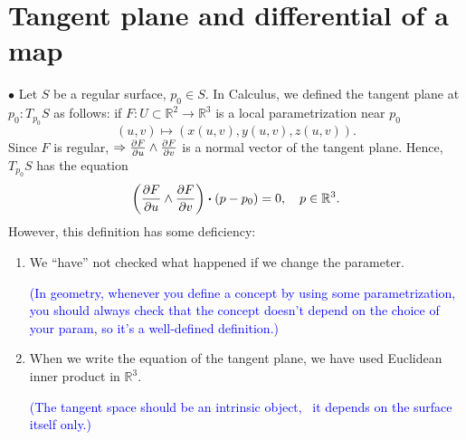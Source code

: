 \section{Tangent plane and differential of a map}
$\bullet$ Let $S$ be a regular surface, \(p_0\in S\). In Calculus, we
defined the tangent plane at \(p_0\colon T_{p_0}S\) as follows: if
\(F\colon U\subset \mathbb{R}^2\to \mathbb{R}^3\) is a local parametrization near \(p_0\)
\[
    (u,v)\mapsto \left(x(u,v),y(u,v),z(u,v)\right).
\]
Since \(F\) is regular, \(\Rightarrow \pdv{F}{u}\wedge\pdv
{F}{v}\) is a normal vector of the tangent plane. Hence,
\(T_{p_0}S\) has the equation
\[
    \left(\pdv{F}{u}\wedge\pdv{F}{v}\right)\vdot
    (p-p_0)=0,\quad p\in \mathbb{R}^3  .
\]
However, this definition has some deficiency:
\begin{enumerate}[(1)]
    \item We ``have'' not checked what happened if we change the parameter.

      \textcolor{blue}{(In geometry, whenever you define a concept by using
          some parametrization, you should always check that the concept doesn't
          depend on the choice of your param, so it's a well-defined
          definition.)}
    \item When we write the equation of the tangent plane, we have used
      Euclidean inner product in $\mathbb{R}^3$.

      \textcolor{blue}{(The tangent space should be an intrinsic object, \ie\ it depends on the surface itself only.)}
\end{enumerate}
